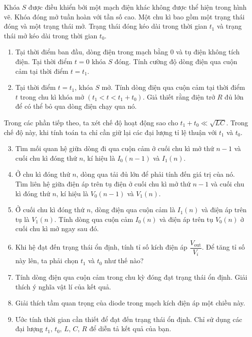 \begin{vd}
\begin{center}
\begin{tikzpicture}[x=0.75pt,y=0.75pt,yscale=-1,xscale=1]
\end{tikzpicture}
\end{center}
Khóa $S$ được điều khiển bởi một mạch điện khác không được thể hiện trong hình vẽ. Khóa đóng mở tuần hoàn với tần số cao. Một chu kì bao gồm một trạng thái đóng và một trạng thái mở. Trạng thái đóng kéo dài trong thời gian $t_1$ và trạng thái mở kéo dài trong thời gian $t_0$.
\begin{enumerate}[1) ]
    \item Tại thời điểm ban đầu, dòng điện trong mạch bằng $0$ và tụ điện không tích điện. Tại thời điểm $t=0$ khóa $S$ đóng. Tính cường độ dòng điện qua cuộn cảm tại thời điểm $t=t_1$.
    \item Tại thời điểm $t=t_1$, khóa $S$ mở. Tính dòng điện qua cuộn cảm tại thời điểm $t$ trong chu kì khóa mở $(t_1<t<t_1+t_0)$. Giả thiết rằng điện trở $R$ đủ lớn để có thể bỏ qua dòng điện chạy qua nó.\\
\end{enumerate}
 Trong các phần tiếp theo, ta xét chế độ hoạt động sao cho $t_1+t_0\ll\sqrt{LC}$. Trong chế độ này, khi tính toán ta chỉ cần giữ lại các đại lượng tỉ lệ thuận với $t_1$ và $t_0$.
\\
\begin{enumerate}  [1)]  
   \setcounter{enumi}{2}
    \item Tìm mối quan hệ giữa dòng đi qua cuộn cảm ở cuối chu kì mở thứ $n-1$  và cuối chu kì đóng thứ $n$, kí hiệu là $I_0(n-1)$ và $I_1(n)$.
    \item Ở chu kì đóng thứ $n$, dòng qua tải đủ lớn để phải tính đến giá trị của nó. Tìm liên hệ giữa điện áp trên tụ điện ở cuối chu kì mở thứ $n-1$ và cuối chu kì đóng thứ $n$, kí hiệu là $V_0(n-1)$ và $V_1(n)$.
    \item Ở cuối chu kì đóng thứ $n$, dòng điện qua cuộn cảm là $I_1(n)$ và điện áp trên tụ là $V_1(n)$. Tính dòng qua cuộn cảm $I_0(n)$ và điện áp trên tụ $V_0(n)$ ở cuối chu kì mở ngay sau đó.
    \item Khi hệ đạt đến trạng thái ổn định, tính tỉ số kích điện áp $\dfrac{V_{\text{out}}}{V_{i}}$. Để tăng tỉ số này lên, ta phải chọn $t_1$ và $t_0$ như thế nào?
    \item Tính dòng điện qua cuộn cảm trong chu kỳ đóng đạt trạng thái ổn định. Giải thích ý nghĩa vật lí của kết quả.
    \item Giải thích tầm quan trọng của diode trong mạch kích điện áp một chiều này.
    \item Ước tính thời gian cần thiết để đạt đến trạng thái ổn định. Chỉ sử dụng các đại lượng $t_1$, $t_0$, $L$, $C$, $R$ để diễn tả kết quả của bạn.
\end{enumerate}
\end{vd}

